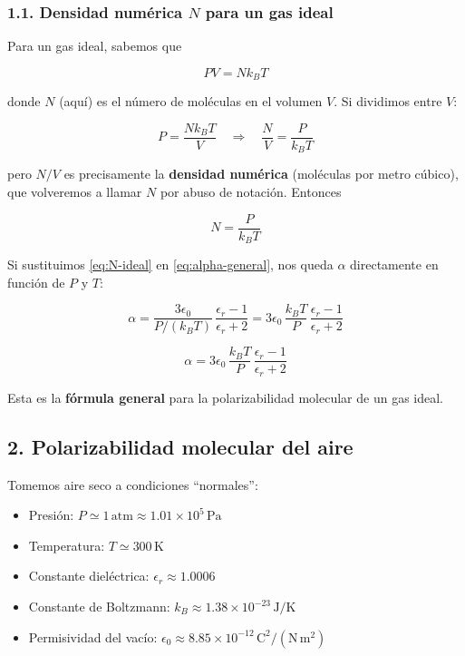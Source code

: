 \documentclass{article}
\begin{document}
\subsubsection*{1.1. Densidad numérica $N$ para un gas ideal}

Para un gas ideal, sabemos que

\[
PV = Nk_{B}T
\]

donde $N$ (aquí) es el número de moléculas en el volumen $V$.  
Si dividimos entre $V$:

\[
P = \frac{Nk_{B}T}{V}
\quad\Longrightarrow\quad
\frac{N}{V} = \frac{P}{k_{B}T}
\]

pero $N/V$ es precisamente la \textbf{densidad numérica} (moléculas por metro cúbico), que volveremos a llamar $N$ por abuso de notación. Entonces

\begin{equation}
N = \frac{P}{k_{B}T}
\label{eq:N-ideal}
\end{equation}

Si sustituimos \eqref{eq:N-ideal} en \eqref{eq:alpha-general}, nos queda $\alpha$ directamente en función de $P$ y $T$:

\[
\alpha = \frac{3\epsilon_{0}}{P/(k_{B}T)}\,\frac{\epsilon_{r} - 1}{\epsilon_{r} + 2}
= 3\epsilon_{0}\,\frac{k_{B}T}{P}\,\frac{\epsilon_{r} - 1}{\epsilon_{r} + 2}
\]

\begin{equation}
\alpha = 3\epsilon_{0}\,\frac{k_{B}T}{P}\,
         \frac{\epsilon_{r} - 1}{\epsilon_{r} + 2}
\label{eq:alpha-PT}
\end{equation}

Esta es la \textbf{fórmula general} para la polarizabilidad molecular de un gas ideal.

\subsection*{2. Polarizabilidad molecular del aire}

Tomemos aire seco a condiciones “normales”:

\begin{itemize}
  \item Presión: $P \simeq 1\,\text{atm} \approx 1.01\times 10^{5}\,\text{Pa}$
  \item Temperatura: $T \simeq 300\,\text{K}$
  \item Constante dieléctrica: $\epsilon_{r} \approx 1.0006$
  \item Constante de Boltzmann: $k_{B} \approx 1.38\times 10^{-23}\,\text{J/K}$
  \item Permisividad del vacío: $\epsilon_{0} \approx 8.85\times 10^{-12}\,\text{C}^{2}/(\text{N}\,\text{m}^{2})$
\end{itemize}
\end{document}
